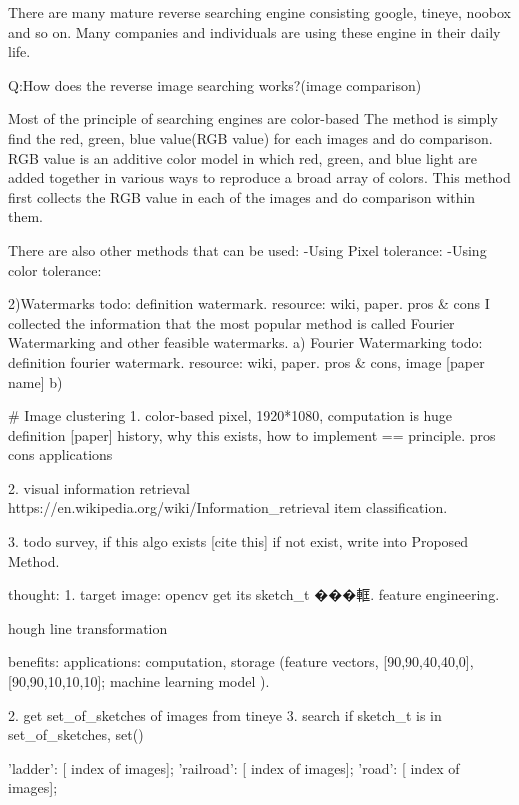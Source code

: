 There are many mature reverse searching engine consisting google, tineye, noobox and so on.
Many companies and individuals are using these engine in their daily life.

Q:How does the reverse image searching works?(image comparison)

Most of the principle of searching engines are color-based
The method is simply find the red, green, blue value(RGB value) for each images and do comparison.
RGB value is an additive color model in which red, green, and blue light are added together in various ways to reproduce a broad array of colors.
This method first collects the RGB value in each of the images and do comparison within them. %

There are also other methods that can be used:
-Using Pixel tolerance:
-Using color tolerance:



2)Watermarks  %
todo: definition watermark. resource: wiki, paper. pros & cons
I collected the information that the most popular method is called Fourier Watermarking and other feasible watermarks.
a) Fourier Watermarking
todo: definition fourier watermark. resource: wiki, paper. pros & cons, image [paper name]
b)






# Image clustering
1. color-based pixel, 1920*1080, computation is huge
definition [paper] \cite{}
history, why this exists, 
how to implement == principle.
pros cons
applications

2. visual information retrieval
https://en.wikipedia.org/wiki/Information_retrieval
item classification.


3. todo survey, if this algo exists [cite this]
if not exist, write into Proposed Method.

thought:
1. target image: opencv get its sketch_t ���軭.  feature engineering.

hough line transformation

benefits:
applications:
computation, storage (feature vectors, [90,90,40,40,0], [90,90,10,10,10];
        machine learning model ).

2. get set_of_sketches of images from tineye
3. search if sketch_t is in set_of_sketches, set()

{
'ladder': [ index of images];
'railroad': [ index of images];
'road': [ index of images];
}

